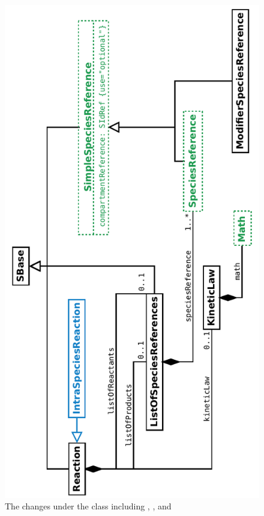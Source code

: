 \begin{figure}[htb]
  \begin{center}
\ifpdf
    \includegraphics[angle=-90, scale=0.7]{./figs/multi_010_Reaction.pdf}
\fi
    \caption{The changes under the \ExReaction class including \IntraSpeciesReaction, \ExSimpleSpeciesReference, \ExSpeciesReference and \ExMath}
  \label{fig:ExReaction}
  \end{center}
\end{figure}

